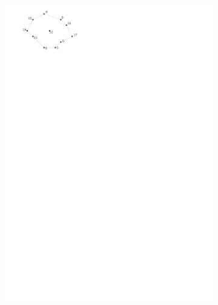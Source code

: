 \begin{figure}
  \centering
  \begin{subfigure}[b]{0.4\linewidth}
    \centering
    \includegraphics[page=1,width=\textwidth]{figs/saddle_contour}
    \caption{}
  \end{subfigure}
  \qquad
  \begin{subfigure}[b]{0.4\linewidth}
    \centering

\end{subfigure}
\end{figure}
